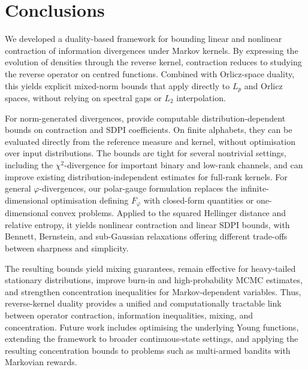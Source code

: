\documentclass[11pt]{article}
\theoremstyle{plain}
\theoremstyle{remark}
\begin{document}
\section{Conclusions}

We developed a duality-based framework for bounding linear and nonlinear contraction of information divergences under Markov kernels. By expressing the evolution of densities through the reverse kernel, contraction reduces to studying the reverse operator on centred functions. Combined with Orlicz-space duality, this yields explicit mixed-norm bounds that apply directly to \(L_p\) and Orlicz spaces, without relying on spectral gaps or \(L_2\) interpolation.

For norm-generated divergences,  provide computable distribution-dependent bounds on contraction and SDPI coefficients. On finite alphabets, they can be evaluated directly from the reference measure and kernel, without optimisation over input distributions. The bounds are tight for several nontrivial settings, including the \(\chi^2\)-divergence for important binary and low-rank channels, and can improve existing distribution-independent estimates for full-rank kernels. For general \(\varphi\)-divergences, our polar-gauge formulation replaces the infinite-dimensional optimisation defining \(F_\varphi\) with closed-form quantities or one-dimensional convex problems. Applied to the squared Hellinger distance and relative entropy, it yields nonlinear contraction and linear SDPI bounds, with Bennett, Bernstein, and sub-Gaussian relaxations offering different trade-offs between sharpness and simplicity.

The resulting bounds yield mixing guarantees, remain effective for heavy-tailed stationary distributions, improve burn-in and high-probability MCMC estimates, and strengthen concentration inequalities for Markov-dependent variables. Thus, reverse-kernel duality provides a unified and computationally tractable link between operator contraction, information inequalities, mixing, and concentration. Future work includes optimising the underlying Young functions, extending the framework to broader continuous-state settings, and applying the resulting concentration bounds to problems such as multi-armed bandits with Markovian rewards.

\end{document}
